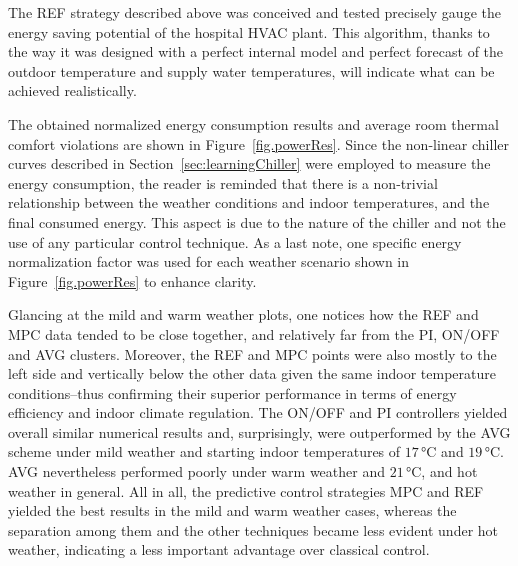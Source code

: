 The REF strategy described above was conceived and tested precisely gauge the energy saving potential of the hospital HVAC plant. This algorithm, thanks to the way it was designed with a perfect internal model and perfect forecast of the outdoor temperature and supply water temperatures, will indicate what can be achieved realistically.

The obtained normalized energy consumption results and average room thermal comfort violations are shown in Figure~\ref{fig.powerRes}. Since the non-linear chiller curves described in Section~\ref{sec:learningChiller} were employed to measure the energy consumption, the reader is reminded that there is a non-trivial relationship between the weather conditions and indoor temperatures, and the final consumed energy. This aspect is due to the nature of the chiller and not the use of any particular control technique. As a last note, one specific energy normalization factor was used for each weather scenario shown in Figure~\ref{fig.powerRes} to enhance clarity.

Glancing at the mild and warm weather plots, one notices how the REF and MPC data tended to be close together, and relatively far from the PI, ON/OFF and AVG clusters. Moreover, the REF and MPC points were also mostly to the left side and vertically below the other data given the same indoor temperature conditions--thus confirming their superior performance in terms of energy efficiency and indoor climate regulation. The ON/OFF and PI controllers yielded overall similar numerical results and, surprisingly, were outperformed by the AVG scheme under mild weather and starting indoor temperatures of $17\,$°C and $19\,$°C. AVG nevertheless performed poorly under warm weather and $21\,$°C, and hot weather in general. All in all, the predictive control strategies MPC and REF yielded the best results in the mild and warm weather cases, whereas the separation among them and the other techniques became less evident under hot weather, indicating a less important advantage over classical control.


